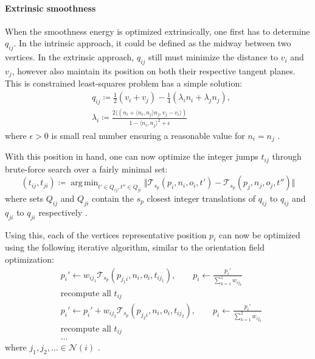 \documentclass{ACGSeminar}
\DeclareMathOperator*{\argmin}{arg\,min}
\begin{document}
\paragraph{Extrinsic smoothness}
When the smoothness energy is optimized extrinsically, one first has to determine $q_{ij}$. In the intrinsic approach, it could be defined as the midway between two vertices. In the extrinsic approach, $q_{ij}$ still must minimize the distance to $v_i$ and $v_j$, however also maintain its position on both their respective tangent planes. This is constrained least-squares problem has a simple solution:
\begin{equation*}
\begin{split}
	& q_{ij} \coloneqq \frac{1}{2}(v_i + v_j) - \frac{1}{4}(\lambda_i n_i + \lambda_j n_j),\\
	& \lambda_i \coloneqq \frac{2 \langle (n_i + \langle n_i, n_j \rangle n_j, v_j - v_i \rangle)}{1 - \langle n_i, n_j \rangle ^2 + \epsilon}
\end{split}
\end{equation*}
where $\epsilon > 0$ is small real number ensuring a reasonable value for $n_i = n_j$ \cite{jakob2015instant}.\bigskip

With this position in hand, one can now optimize the integer jumps $t_{ij}$ through brute-force search over a fairly minimal set:
\begin{equation*}
	(t_{ij}, t_{ji}) \coloneqq \argmin_{t' \in Q_{ij}, t'' \in Q_{ji}} \Vert \mathcal{T}_{s_p}(p_i, n_i, o_i, t') - \mathcal{T}_{s_p}(p_j, n_j, o_j, t'') \Vert
\end{equation*}
where sets $Q_{ij}$ and $Q_{ji}$ contain the $s_p$ closest integer translations of $q_{ij}$ to $q_{ij}$ and $q_{ji}$ to $q_{ji}$ respectively \cite{jakob2015instant}.\bigskip

Using this, each of the vertices representative position $p_i$ can now be optimized using the following iterative algorithm, similar to the orientation field optimization:
\begin{equation*}
\begin{split}
	& p_i' \leftarrow w_{ij_1} \mathcal{T}_{s_p}(p_{j_1i}, n_i, o_i, t_{ij_1}), \qquad p_i \leftarrow \frac{p_i'}{\sum_{k=1}^1 w_{ij_k}} \\
	& \textrm{recompute all } t_{ij}\\
	& p_i' \leftarrow p_i' + w_{ij_2} \mathcal{T}_{s_p}(p_{j_2i}, n_i, o_i, t_{ij_2}), \qquad p_i \leftarrow \frac{p_i'}{\sum_{k=1}^2 w_{ij_k}} \\
	& \textrm{recompute all } t_{ij}\\
	& \dots
\end{split}
\end{equation*}
where $j_1, j_2, \dots \in \mathcal{N}(i)$ \cite{jakob2015instant}.
\end{document}
